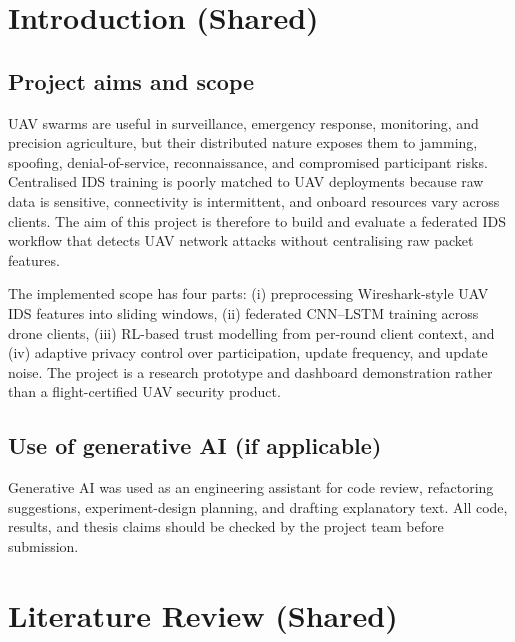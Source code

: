 \documentclass[11pt,a4paper,oneside]{report}
\begin{document}
\chapter{Introduction (Shared)}
\label{ch:intro}

\section{Project aims and scope}
UAV swarms are useful in surveillance, emergency response, monitoring, and
precision agriculture, but their distributed nature exposes them to jamming,
spoofing, denial-of-service, reconnaissance, and compromised participant risks.
Centralised IDS training is poorly matched to UAV deployments because raw data is
sensitive, connectivity is intermittent, and onboard resources vary across
clients. The aim of this project is therefore to build and evaluate a federated
IDS workflow that detects UAV network attacks without centralising raw packet
features.

The implemented scope has four parts: (i) preprocessing Wireshark-style UAV IDS
features into sliding windows, (ii) federated CNN--LSTM training across drone
clients, (iii) RL-based trust modelling from per-round client context, and
(iv) adaptive privacy control over participation, update frequency, and update
noise. The project is a research prototype and dashboard demonstration rather
than a flight-certified UAV security product.

\section{Use of generative AI (if applicable)}
Generative AI was used as an engineering assistant for code review, refactoring
suggestions, experiment-design planning, and drafting explanatory text. All code,
results, and thesis claims should be checked by the project team before
submission.

\chapter{Literature Review (Shared)}
\label{ch:litreview}
\end{document}
